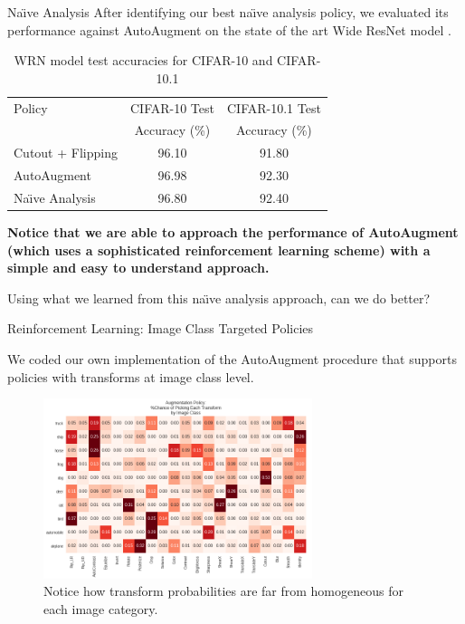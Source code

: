 \documentclass[final]{beamer}
\newlength{\onecolwid}
\begin{document}
\begin{frame}[t]
\begin{columns}[t]
\begin{column}{\onecolwid}
\begin{block}{Na\"{\i}ve Analysis}
  After identifying our best na\"{\i}ve analysis policy, we evaluated its performance against AutoAugment on the state of the art Wide ResNet model \cite{Zagoruyko2016}.

  \begin{table}[h]
	\begin{tabular}{l|c|c}
		\hline
		Policy  &CIFAR-10 Test  &CIFAR-10.1 Test  \\
		&Accuracy (\%)  &Accuracy (\%) \\ \hline
		Cutout + Flipping                 & 96.10 & 91.80 \\
		AutoAugment			        & 96.98 & 92.30 \\
		Na\"{\i}ve Analysis 			&96.80	&92.40 \\
	\end{tabular}
	\caption{WRN model \cite{Zagoruyko2016} test accuracies for CIFAR-10 and CIFAR-10.1}
  \end{table}

  \textbf{Notice that we are able to approach the performance of AutoAugment (which uses a sophisticated reinforcement learning scheme) with a simple and easy to understand approach.}

  Using what we learned from this na\"{\i}ve analysis approach, can we do better?  

\end{block}



\begin{block}{Reinforcement Learning: Image Class Targeted Policies}

  We coded our own implementation of the AutoAugment procedure that supports policies with transforms at image class level. 

  \begin{figure}
	\centering
	\includegraphics[width=0.70\textwidth]{splitPolicy.png}
	\caption{
		Notice how transform probabilities are far from homogeneous for each image category.}
	\label{fig:cutout_ship}
  \end{figure}


\end{block}
\end{column}
\end{columns}
\end{frame}
\end{document}
